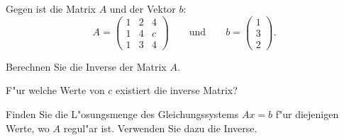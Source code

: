 Gegen ist die Matrix $A$ und der Vektor $b$:
\[
A
=
\begin{pmatrix}
1&2&4\\
1&4&c\\
1&3&4
\end{pmatrix}
\qquad
\text{und}
\qquad
b=\begin{pmatrix}1\\3\\2\end{pmatrix}.
\]
\begin{teilaufgaben}
\item
Berechnen Sie die Inverse der Matrix $A$.
\item
F"ur welche Werte von $c$ existiert die inverse Matrix?
\item
Finden Sie die L"osungsmenge des Gleichungssystems $Ax=b$ f"ur diejenigen
Werte, wo $A$ regul"ar ist. Verwenden Sie dazu die Inverse.
\end{teilaufgaben}

